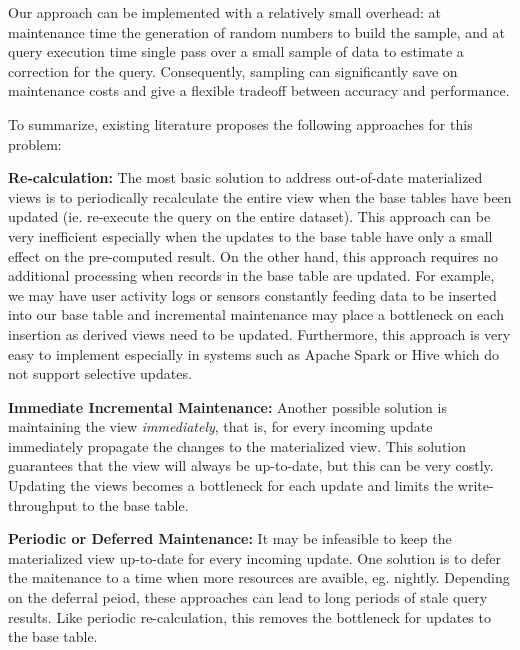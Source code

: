 Our approach can be implemented with a relatively small overhead: at maintenance time the generation of random numbers to build the sample, and at query execution time single pass over a small sample of data to estimate a correction for the query.
Consequently, sampling can significantly save on maintenance costs and give a flexible tradeoff between accuracy and performance.

To summarize, existing literature proposes the following approaches for this problem: 
\vspace{1em}

\noindent\textbf{Re-calculation: }
The most basic solution to address out-of-date materialized views is to periodically 
recalculate the entire view when the base tables have been updated (ie. re-execute the query on the entire dataset).
This approach can be very inefficient especially when the updates to the base table have only a small effect on the pre-computed result.
On the other hand, this approach requires no additional processing when records in the base table are updated.
For example, we may have user activity logs or sensors constantly feeding data to be inserted into our base table and incremental maintenance 
may place a bottleneck on each insertion as derived views need to be updated.
Furthermore, this approach is very easy to implement especially in systems such as Apache Spark or Hive which do not support
selective updates. 

\vspace{1em}

\noindent\textbf{Immediate Incremental Maintenance: }
Another possible solution is maintaining the view \emph{immediately}, that is, for every incoming update
immediately propagate the changes to the materialized view.
This solution guarantees that the view will always be up-to-date, but this can be very costly.
Updating the views becomes a bottleneck for each update and limits the write-throughput to the base table.

\vspace{1em}

\noindent\textbf{Periodic or Deferred Maintenance: }
It may be infeasible to keep the materialized view up-to-date for every incoming update.
One solution is to defer the maitenance to a time when more resources are avaible, eg. nightly.
Depending on the deferral peiod, these approaches can lead to long periods of stale query results.
Like periodic re-calculation, this removes the bottleneck for updates to the base table.


